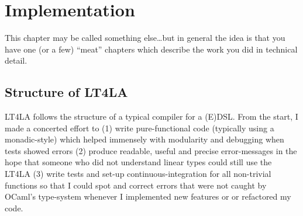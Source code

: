 \chapter{Implementation}

\begin{guidance}
This chapter may be called something else\ldots but in general
the idea is that you have one (or a few) ``meat'' chapters which
describe the work you did in technical detail.
\end{guidance}

%

\section{Structure of LT4LA}

LT4LA follows the structure of a typical compiler for a (E)DSL\@. From the
start, I made a concerted effort to (1) write pure-functional code (typically
using a monadic-style) which helped immensely with modularity and debugging
when tests showed errors (2) produce readable, useful and precise
error-messages in the hope that someone who did not understand linear types
could still use the LT4LA (3) write tests and set-up
continuous-integration for all non-trivial functions so that I could spot and
correct errors that were not caught by OCaml's type-system whenever I
implemented new features or or refactored my code.

